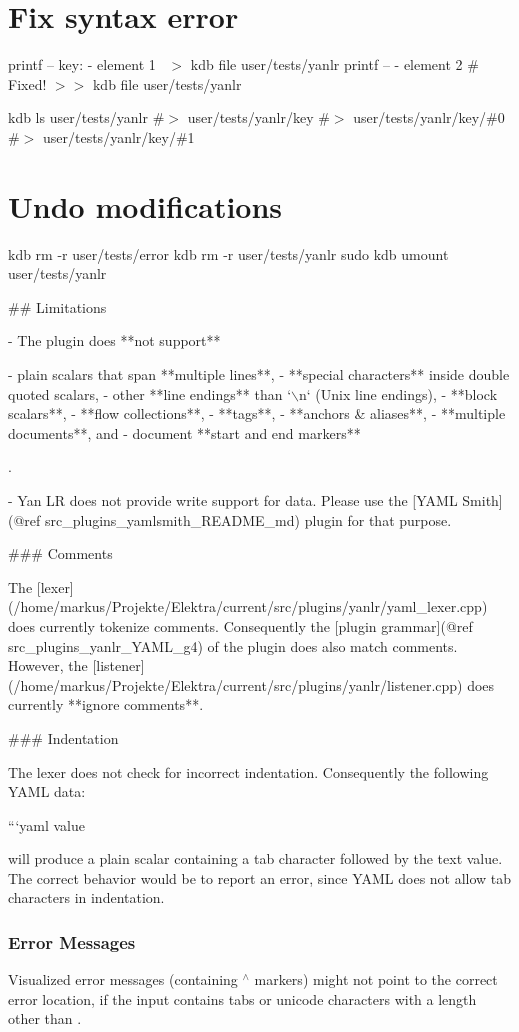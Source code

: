 \section*{Fix syntax error}

printf -- \textquotesingle{}key\+: -\/ element 1~\newline
\textquotesingle{} $>$ {\ttfamily kdb file user/tests/yanlr} printf -- \textquotesingle{} -\/ element 2 \# Fixed!\textquotesingle{} $>$$>$ {\ttfamily kdb file user/tests/yanlr}

kdb ls user/tests/yanlr \#$>$ user/tests/yanlr/key \#$>$ user/tests/yanlr/key/\#0 \#$>$ user/tests/yanlr/key/\#1

\section*{Undo modifications}

kdb rm -\/r user/tests/error kdb rm -\/r user/tests/yanlr sudo kdb umount user/tests/yanlr 
\begin{DoxyCode}
## Limitations

- The plugin does **not support**

  - plain scalars that span **multiple lines**,
  - **special characters** inside double quoted scalars,
  - other **line endings** than `\(\backslash\)n` (Unix line endings),
  - **block scalars**,
  - **flow collections**,
  - **tags**,
  - **anchors & aliases**,
  - **multiple documents**, and
  - document **start and end markers**

  .

- Yan LR does not provide write support for data. Please use the [YAML Smith](@ref
       src\_plugins\_yamlsmith\_README\_md) plugin for that purpose.

### Comments

The [lexer](/home/markus/Projekte/Elektra/current/src/plugins/yanlr/yaml\_lexer.cpp) does currently tokenize
       comments. Consequently the [plugin grammar](@ref src\_plugins\_yanlr\_YAML\_g4) of the plugin does also match
       comments. However, the [listener](/home/markus/Projekte/Elektra/current/src/plugins/yanlr/listener.cpp) does
       currently **ignore comments**.

### Indentation

The lexer does not check for incorrect indentation. Consequently the following YAML data:



```yaml
        value
\end{DoxyCode}


will produce a plain scalar containing a tab character followed by the text {\ttfamily value}. The correct behavior would be to report an error, since Y\+A\+ML does not allow tab characters in indentation.

\subsubsection*{Error Messages}

Visualized error messages (containing {\ttfamily $^\wedge$} markers) might not point to the correct error location, if the input contains tabs or unicode characters with a length other than {}. 